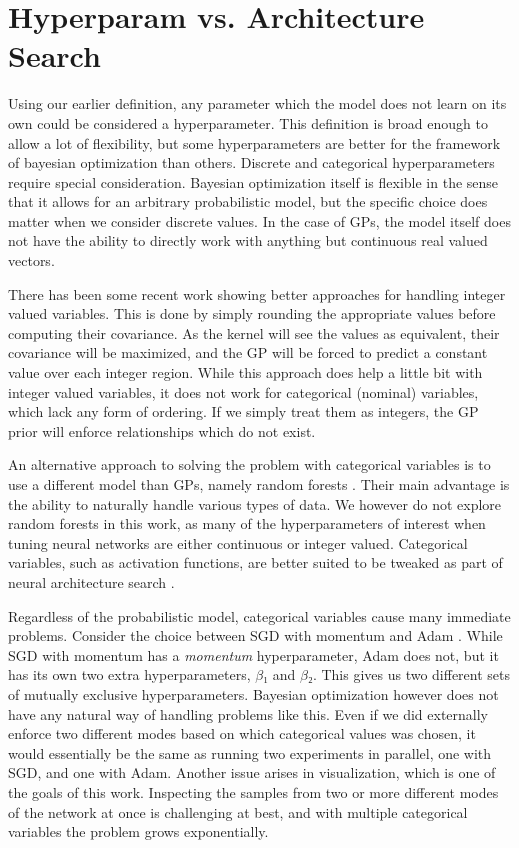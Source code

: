 \section{Hyperparam vs. Architecture Search}

Using our earlier definition, any parameter which the model does not learn on
its own could be considered a hyperparameter. This definition is broad enough
to allow a lot of flexibility, but some hyperparameters are better for the
framework of bayesian optimization than others. Discrete and categorical
hyperparameters require special consideration. Bayesian optimization itself is
flexible in the sense that it allows for an arbitrary probabilistic model, but
the specific choice does matter when we consider discrete values. In the case
of GPs, the model itself does not have the ability to directly work with
anything but continuous real valued vectors.

There has been some recent work \citep{integer-valued-gp} showing better
approaches for handling integer valued variables. This is done by simply
rounding the appropriate values before computing their covariance. As the
kernel will see the values as equivalent, their covariance will be maximized,
and the GP will be forced to predict a constant value over each integer region.
While this approach does help a little bit with integer valued variables, it
does not work for categorical (nominal) variables, which lack any form of
ordering. If we simply treat them as integers, the GP prior will enforce
relationships which do not exist.

An alternative approach to solving the problem with categorical variables is to
use a different model than GPs, namely random forests
\citep{nando-bayesian-out-of-the-loop}. Their main advantage is the ability to
naturally handle various types of data. We however do not explore random
forests in this work, as many of the hyperparameters of interest when tuning
neural networks are either continuous or integer valued. Categorical variables,
such as activation functions, are better suited to be tweaked as part of neural
architecture search \citep{nasnet}.

Regardless of the probabilistic model, categorical variables cause many
immediate problems.  Consider the choice between SGD with momentum
\citep{overview-of-sgd} and Adam \citep{kingma2014adam}.  While SGD with
momentum has a \emph{momentum} hyperparameter, Adam does not, but it has its
own two extra hyperparameters, $β₁$ and $β₂$. This gives us two different sets
of mutually exclusive hyperparameters. Bayesian optimization however does not
have any natural way of handling problems like this. Even if we did externally
enforce two different modes based on which categorical values was chosen, it
would essentially be the same as running two experiments in parallel, one with
SGD, and one with Adam. Another issue arises in visualization, which is one of
the goals of this work. Inspecting the samples from two or more different modes
of the network at once is challenging at best, and with multiple categorical
variables the problem grows exponentially.

